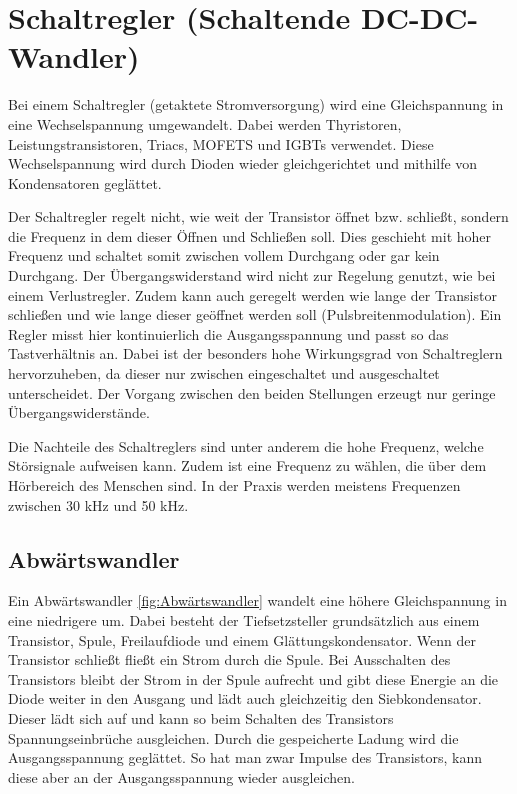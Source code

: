 \section{Schaltregler (Schaltende DC-DC-Wandler)}

Bei einem Schaltregler (getaktete Stromversorgung) wird eine Gleichspannung in eine Wechselspannung umgewandelt. Dabei werden Thyristoren, Leistungstransistoren, Triacs, MOFETS und IGBTs verwendet. Diese Wechselspannung wird durch Dioden wieder gleichgerichtet und mithilfe von Kondensatoren geglättet. 

\bigskip

Der Schaltregler regelt nicht, wie weit der Transistor öffnet bzw. schließt, sondern die Frequenz in dem dieser Öffnen und Schließen soll. Dies geschieht mit hoher Frequenz und schaltet somit zwischen vollem Durchgang oder gar kein Durchgang. Der Übergangswiderstand wird  nicht zur Regelung genutzt, wie bei einem Verlustregler. Zudem  kann auch geregelt werden wie lange der Transistor schließen und wie lange dieser geöffnet werden soll (Pulsbreitenmodulation). Ein Regler misst hier kontinuierlich die Ausgangsspannung und passt so das Tastverhältnis an. Dabei ist der besonders hohe Wirkungsgrad  von Schaltreglern hervorzuheben, da dieser nur zwischen eingeschaltet und ausgeschaltet unterscheidet. Der Vorgang zwischen den beiden Stellungen erzeugt nur geringe Übergangswiderstände. 

\bigskip

Die Nachteile des Schaltreglers sind unter anderem die hohe Frequenz, welche Störsignale aufweisen kann. Zudem ist eine Frequenz zu wählen, die über dem Hörbereich des Menschen sind. In der Praxis werden meistens Frequenzen zwischen 30 kHz und 50 kHz. \cite{Ekbert:2014}

\subsection{Abwärtswandler}

Ein Abwärtswandler \ref{fig:Abwärtswandler} wandelt eine höhere Gleichspannung in eine niedrigere um. Dabei besteht der Tiefsetzsteller grundsätzlich aus einem Transistor, Spule, Freilaufdiode und einem Glättungskondensator. Wenn der Transistor schließt fließt ein Strom durch die Spule. Bei Ausschalten des Transistors bleibt der Strom in der Spule aufrecht und gibt diese Energie an die Diode weiter in den Ausgang und lädt auch gleichzeitig den Siebkondensator. Dieser lädt sich auf und kann so beim Schalten des Transistors Spannungseinbrüche ausgleichen. Durch die gespeicherte Ladung wird die Ausgangsspannung geglättet. So hat man zwar Impulse des Transistors, kann diese aber an der Ausgangsspannung wieder ausgleichen.  

